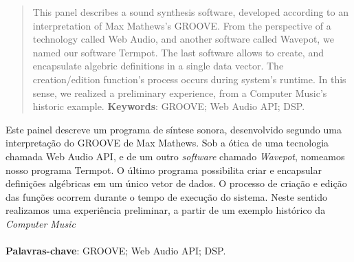 \documentclass[12pt]{article}
\begin{document}
 

\maketitle


\begin{abstract}
This panel describes a sound synthesis software, developed according to an interpretation of Max Mathews's GROOVE. From the perspective of a technology called Web Audio, and another software called Wavepot, we named our software Termpot. The last software allows to create, and encapsulate algebric definitions in a single data vector. The creation/edition function's process occurs during system's runtime. In this sense, we realized a preliminary experience, from a Computer Music's historic example.
\textbf{Keywords}: GROOVE; Web Audio API; DSP.
\end{abstract}

\begin{resumo} 
Este painel descreve um programa de síntese sonora, desenvolvido segundo uma interpretação do GROOVE de Max Mathews. Sob a ótica de uma tecnologia chamada Web Audio API, e de um outro \emph{software} chamado \emph{Wavepot}, nomeamos nosso programa Termpot. O último programa possibilita criar e encapsular definições algébricas em um único vetor de dados. O processo de criação e edição das funções ocorrem durante o tempo de execução do sistema. Neste sentido realizamos uma experiência preliminar, a partir de um exemplo histórico da \emph{Computer Music}
\ \\
\ \\
\textbf{Palavras-chave}: GROOVE; Web Audio API; DSP.
\end{resumo}



%

%
%
 


\end{document}
